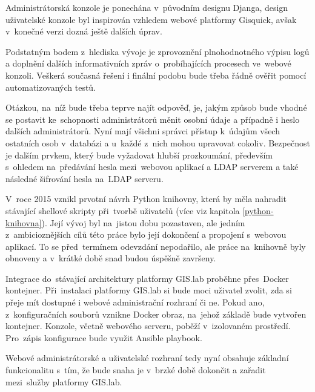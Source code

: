 Administrátorská konzole je ponechána v~původním designu Djanga,
design uživatelské konzole byl inspirován vzhledem webové platformy
Gisquick, avšak v~konečné verzi dozná ještě dalších úprav.

Podstatným bodem z~hlediska vývoje je zprovoznění plnohodnotného
výpisu logů a doplnění dalších informativních zpráv o~probíhajících
procesech ve~webové konzoli. Veškerá současná řešení i finální podobu
bude třeba řádně ověřit pomocí automatizovaných testů.

Otázkou, na~níž bude třeba teprve najít odpověď, je, jakým způsob bude
vhodné se postavit ke~schopnosti administrátorů měnit osobní údaje a
případně i heslo dalších administrátorů. Nyní mají všichni správci
přístup k~údajům všech ostatních osob v~databázi a u~každé z~nich
mohou upravovat cokoliv. Bezpečnost je dalším prvkem, který bude
vyžadovat hlubší prozkoumání, především s~ohledem na~předávání hesla
mezi~webovou aplikací a LDAP serverem a také následné šifrování hesla
na~LDAP serveru.

V~roce 2015 vznikl prvotní návrh Python knihovny, která by měla
nahradit stávající shellové skripty při~tvorbě uživatelů (více viz
kapitola \ref{python-knihovna}). Její vývoj byl na~jistou dobu
pozastaven, ale jedním z~ambicioznějších cílů této práce bylo její
dokončení a propojení s~webovou aplikací. To se před~termínem
odevzdání nepodařilo, ale práce na~knihovně byly obnoveny a v~krátké
době snad budou úspěšně završeny.

Integrace do~stávající architektury platformy GIS.lab proběhne 
přes~Docker kontejner. Při~instalaci platformy GIS.lab si bude moci
uživatel zvolit, zda si přeje mít dostupné i webové administrační
rozhraní či ne. Pokud ano, z~konfiguračních souborů vznikne Docker
obraz, na~jehož základě bude vytvořen kontejner. Konzole, včetně
webového serveru, poběží v~izolovaném prostředí. Pro~zápis konfigurace
bude využit Ansible playbook.

Webové administrátorské a uživatelské rozhraní tedy nyní obsahuje
základní funkcionalitu s~tím, že bude snaha je v~brzké době dokončit a
zařadit mezi~služby platformy GIS.lab.

